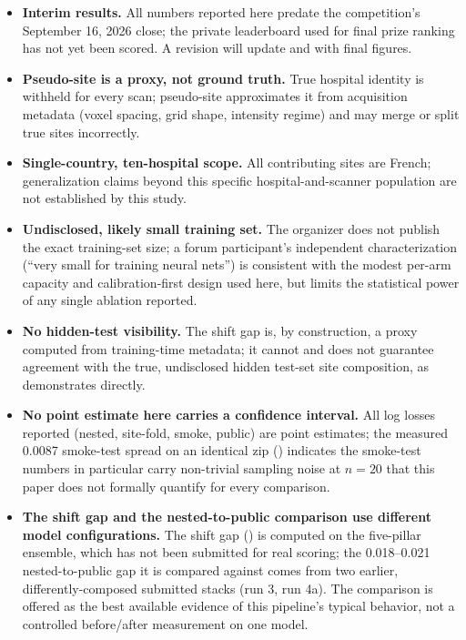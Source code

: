 \documentclass[11pt]{article}
\begin{document}
\begin{itemize}[leftmargin=*]
\item \textbf{Interim results.} All numbers reported here predate the competition's September 16, 2026 close; the private leaderboard used for final prize ranking has not yet been scored. A revision will update  and  with final figures.
\item \textbf{Pseudo-site is a proxy, not ground truth.} True hospital identity is withheld for every scan; pseudo-site approximates it from acquisition metadata (voxel spacing, grid shape, intensity regime) and may merge or split true sites incorrectly.
\item \textbf{Single-country, ten-hospital scope.} All contributing sites are French; generalization claims beyond this specific hospital-and-scanner population are not established by this study.
\item \textbf{Undisclosed, likely small training set.} The organizer does not publish the exact training-set size; a forum participant's independent characterization (``very small for training neural nets'') is consistent with the modest per-arm capacity and calibration-first design used here, but limits the statistical power of any single ablation reported.
\item \textbf{No hidden-test visibility.} The shift gap is, by construction, a proxy computed from training-time metadata; it cannot and does not guarantee agreement with the true, undisclosed hidden test-set site composition, as  demonstrates directly.
\item \textbf{No point estimate here carries a confidence interval.} All log losses reported (nested, site-fold, smoke, public) are point estimates; the measured 0.0087 smoke-test spread on an identical zip () indicates the smoke-test numbers in particular carry non-trivial sampling noise at $n=20$ that this paper does not formally quantify for every comparison.
\item \textbf{The shift gap and the nested-to-public comparison use different model configurations.} The shift gap () is computed on the five-pillar ensemble, which has not been submitted for real scoring; the 0.018--0.021 nested-to-public gap it is compared against comes from two earlier, differently-composed submitted stacks (run 3, run 4a). The comparison is offered as the best available evidence of this pipeline's typical behavior, not a controlled before/after measurement on one model.
\end{itemize}
\end{document}
